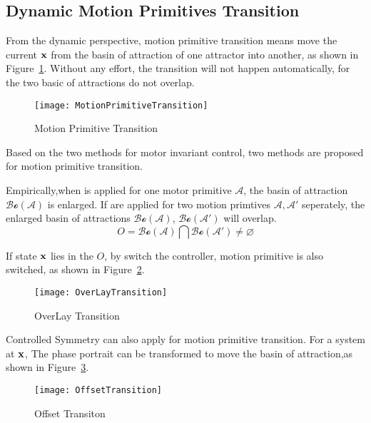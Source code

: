 \subsection{Dynamic Motion Primitives Transition}
From  the dynamic perspective, motion primitive transition means move the current $\mathbf{x}$ from the basin of attraction of one attractor into another, as shown in Figure~\ref{fig:motion-transition}.
Without any effort, the transition will not happen automatically, for the two basic of attractions do not overlap.



\begin{figure}[!htbp]
  \begin{center}
      \texttt{[image: MotionPrimitiveTransition]}
    \caption{Motion Primitive Transition}
    \label{fig:motion-transition}
  \end{center}
\end{figure}


Based on the two methods for motor invariant control, two methods are proposed for motion primitive transition.
\begin{itemize}
Empirically,when \cpg is applied for one motor primitive $\mathcal{A}$, the basin of attraction $\mathcal{Bo}(\mathcal{A})$ is enlarged.
If \cpg are applied for two motion primtives $\mathcal{A,A'}$ seperately, the enlarged basin of attractions $\mathcal{Bo}(\mathcal{A})$,
$\mathcal{Bo}(\mathcal{A'})$ will overlap.
\[
O =
\mathcal{Bo}(\mathcal{A}) 
\bigcap \mathcal{Bo}(\mathcal{A'}) 
\neq \varnothing
\]
 
If  state $\mathbf{x}$ lies in the $O$, by switch the \cpg controller, motion primitive is also switched, as shown in Figure~\ref{fig:motion-overlay}.


\begin{figure}[!htbp]
  \begin{center}
      \texttt{[image: OverLayTransition]}
    \caption{OverLay Transition}
    \label{fig:motion-overlay}
  \end{center}
\end{figure}


Controlled Symmetry can also apply for motion primitive transition.
For a system at $\mathbf{x}$,  The phase portrait can be transformed to move the basin of attraction,as shown in Figure~\ref{fig:transform-offset}.


\begin{figure}[!htbp]
  \begin{center}
      \texttt{[image: OffsetTransition]}
    \caption{Offset Transiton}
    \label{fig:transform-offset}
  \end{center}
\end{figure}
\end{itemize}




